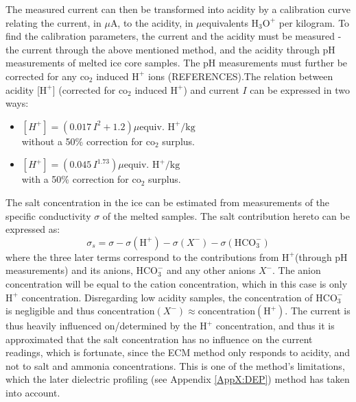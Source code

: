 \documentclass[../../CompleteThesis2/Complete_2ndDraft]{subfiles}
\begin{document}
The measured current can then be transformed into acidity by a calibration curve relating the current, in $\mu$A, to the acidity, in $\mu$equivalents $\text{H}_3\text{O}^+$ per kilogram. To find the calibration parameters, the current and the acidity must be measured - the current through the above mentioned method, and the acidity through pH measurements of melted ice core samples. The pH measurements must further be corrected for any $\text{co}_2$ induced $\text{H}^+$ ions (REFERENCES).The relation between acidity [$\text{H}^+$] (corrected for $\text{co}_2$ induced $\text{H}^+$) and current $I$ can be expressed in two ways:
\begin{itemize}
	\item $[H^+] = (0.017\, I^2 + 1.2) \mu \text{equiv. H}^+ /\text{kg}$\\
	without a 50\% correction for $\text{co}_2$ surplus.
	\item $[H^+] = (0.045\, I^{1.73}) \mu \text{equiv. H}^+ /\text{kg}$\\
	with a 50\% correction for $\text{co}_2$ surplus.
\end{itemize}
The salt concentration in the ice can be estimated from measurements of the specific conductivity $\sigma$ of the melted samples. The salt contribution hereto can be expressed as:
\begin{equation}
	\sigma_s = \sigma - \sigma(\text{H}^+) - \sigma(X^-) - \sigma(\text{HCO}_3^-)
\end{equation}
where the three later terms correspond to the contributions from $\text{H}^+$(through pH measurements) and its anions\footnotemark, $\text{HCO}_3^-$ and any other anions $X^-$. The anion concentration will be equal to the cation concentration, which in this case is only $\text{H}^+$ concentration. Disregarding low acidity samples, the concentration of $\text{HCO}_3^-$ is negligible and thus  $\text{concentration}(X^-) \approx \text{concentration}(\text{H}^+)$. 
The current is thus heavily influenced on/determined by the $\text{H}^+$ concentration, and thus it is approximated that the salt concentration has no influence on the current readings, which is fortunate, since the ECM method only responds to acidity, and not to salt and ammonia concentrations. This is one of the method's limitations, which the later dielectric profiling (see Appendix \ref{AppX:DEP}) method has taken into account.

\end{document}
